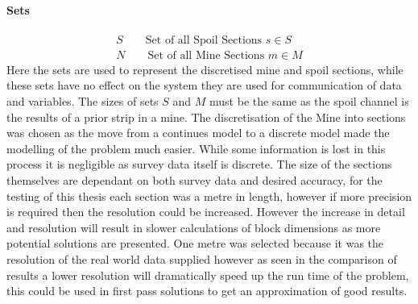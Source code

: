 \paragraph*{Sets}
\begin{align}
\label{MIP:Set:S}
S\qquad \text{Set of all Spoil Sections   } s\in S\\
\label{MIP:Set:N}
N\qquad \text{Set  of all Mine Sections } m \in M
\end{align}
Here the sets are used to represent the discretised mine and spoil sections, while these sets have no effect on the system they are used for communication of data and variables. The sizes of sets $S$ and $M$ must be the same as the spoil channel is the results of a prior strip in a mine. The discretisation of the Mine into sections was chosen as the move from a continues model to a discrete model made the modelling of the problem much easier. While some information is lost in this process it is negligible as survey data itself is discrete. The size of the sections themselves are dependant on both survey data and desired accuracy, for the testing of this thesis each section was a metre in length, however if more precision is required then the resolution could be increased. However the increase in detail and resolution will result in slower calculations of block dimensions as more potential solutions are presented. One metre was selected because it was the resolution of the real world data supplied however as seen in the comparison of results a lower resolution will dramatically speed up the run time of the problem, this could be used in first pass solutions to get an approximation of good results. 
